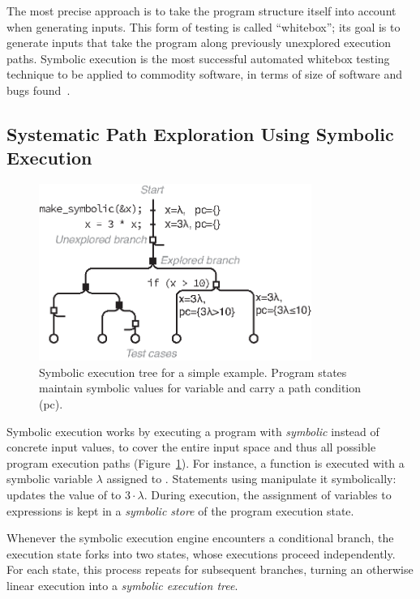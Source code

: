 The most precise approach is to take the program structure itself into account when generating inputs.
%
This form of testing is called ``whitebox''; its goal is to generate inputs that take the program along previously unexplored execution paths.
%
Symbolic execution is the most successful automated whitebox testing technique to be applied to commodity software, in terms of size of software and bugs found~\cite{sage2012,all-symbex,decades-symbex,practice-symbex}.

\subsection{Systematic Path Exploration Using Symbolic Execution}
\label{sec:intro:symbex}

\begin{figure}
  \centering
  \includegraphics[width=3.5in]{figures/intro/symbex-tree}
  \caption{Symbolic execution tree for a simple example.  Program states maintain symbolic values for variable  and carry a path condition (pc).}
  \label{fig:intro:symbex-tree}
\end{figure}

Symbolic execution works by executing a program with \emph{symbolic} instead of concrete input values, to cover the entire input space and thus all possible program execution paths (Figure~\ref{fig:intro:symbex-tree}).  For instance, a function  is executed with a symbolic variable $\lambda$ assigned to .
%
Statements using  manipulate it symbolically:  updates the value of  to $3 \cdot \lambda$.  During execution, the assignment of variables to expressions is kept in a \emph{symbolic store} of the program execution state.

Whenever the symbolic execution engine encounters a conditional branch, the execution state forks into two states, whose executions proceed independently.  For each state, this process repeats for subsequent branches, turning an otherwise linear execution into a \emph{symbolic execution tree}.

